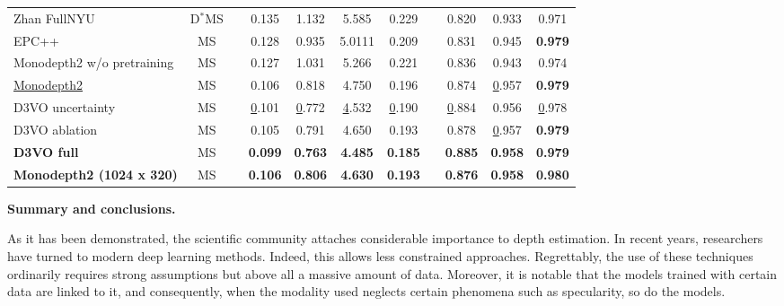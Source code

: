 \begin{table}[h]
{\begin{tabular}{lcccccccccc}
			Zhan FullNYU \cite{zhan2018unsupervised}              & D$^*$MS &  & 0.135       & 1.132       & 5.585  & 0.229    &  & 0.820 & 0.933       & 0.971          \\
			EPC++ \cite{luo2019every}                     & MS      &  & 0.128       & 0.935       & 5.0111 & 0.209    &  & 0.831 & 0.945       & \textbf{0.979} \\
			Monodepth2 w/o pretraining \cite{godard2019digging} & MS      &  & 0.127       & 1.031       & 5.266  & 0.221    &  & 0.836 & 0.943       & 0.974          \\
			\underline{Monodepth2} \cite{godard2019digging}                & MS      &  & 0.106       & 0.818       & 4.750  & 0.196    &  & 0.874 & {\ul 0.957} & \textbf{0.979} \\
			D3VO uncertainty \cite{yang2020d3vo} &
			MS &
			&
			{\ul 0.101} &
			{\ul 0.772} &
			{\ul 4.532} &
			{\ul 0.190} &
			&
			{\ul 0.884} &
			0.956 &
			{\ul 0.978} \\
			D3VO ablation \cite{yang2020d3vo}             & MS      &  & 0.105       & 0.791       & 4.650  & 0.193    &  & 0.878 & {\ul 0.957} & \textbf{0.979} \\
			\textbf{D3VO full} \cite{yang2020d3vo} &
			MS &
			&
			\textbf{0.099} &
			\textbf{0.763} &
			\textbf{4.485} &
			\textbf{0.185} &
			&
			\textbf{0.885} &
			\textbf{0.958} &
			\textbf{0.979} \\ \hline
			\textbf{Monodepth2 (1024 x 320)} \cite{godard2019digging} &
			MS &
			&
			\textbf{0.106} &
			\textbf{0.806} &
			\textbf{4.630} &
			\textbf{0.193} &
			\textbf{} &
			\textbf{0.876} &
			\textbf{0.958} &
			\textbf{0.980}
		\end{tabular}%
	}
\end{table}

\textbf{Summary and conclusions. } 

As it has been demonstrated, the scientific community attaches considerable importance to depth estimation. In recent years, researchers have turned to modern deep learning methods. Indeed, this allows less constrained approaches. Regrettably, the use of these techniques ordinarily requires strong assumptions but above all a massive amount of data. Moreover, it is notable that the models trained with certain data are linked to it, and consequently, when the modality used neglects certain phenomena such as specularity, so do the models. 



